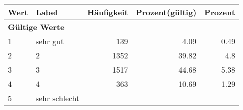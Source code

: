      \begin{longtable}{lXrrr}
     \toprule
     \textbf{Wert} & \textbf{Label} & \textbf{Häufigkeit} & \textbf{Prozent(gültig)} & \textbf{Prozent} \\
     \endhead
     \midrule
     \multicolumn{5}{l}{\textbf{Gültige Werte}}\\

     1 &
     \multicolumn{1}{X}{ sehr gut   } &


       \num{139} &
       \num[round-mode=places,round-precision=2]{4,09} &
         \num[round-mode=places,round-precision=2]{0,49} \\

     2 &
     \multicolumn{1}{X}{ 2   } &


       \num{1352} &
       \num[round-mode=places,round-precision=2]{39,82} &
         \num[round-mode=places,round-precision=2]{4,8} \\

     3 &
     \multicolumn{1}{X}{ 3   } &


       \num{1517} &
       \num[round-mode=places,round-precision=2]{44,68} &
         \num[round-mode=places,round-precision=2]{5,38} \\

     4 &
     \multicolumn{1}{X}{ 4   } &


       \num{363} &
       \num[round-mode=places,round-precision=2]{10,69} &
         \num[round-mode=places,round-precision=2]{1,29} \\

     5 &
     \multicolumn{1}{X}{ sehr schlecht   } &



\end{longtable}
